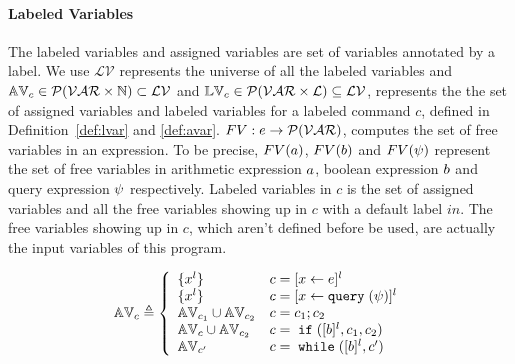 \paragraph{Labeled Variables}
The labeled variables and assigned variables are set of variables annotated by a label. 
We use  
$\mathcal{LV}$ represents the universe of all the labeled variables and 
$\mathbb{AV}_c \in \mathcal{P}(\mathcal{VAR} \times \mathbb{N}) \subset \mathcal{LV}$ and 
$\mathbb{LV}_c \in \mathcal{P}(\mathcal{VAR} \times \mathcal{L}) \subseteq \mathcal{LV}$,
represents the the set of assigned variables and labeled variables for a labeled command $c$,
defined in Definition~\ref{def:lvar} and \ref{def:avar}.
%
$FV: e \to \mathcal{P}(\mathcal{VAR})$, computes the set of free variables in an expression. To be precise,
$FV(a)$, $FV(b)$ and $FV(\psi)$ represent the set of free variables in arithmetic
expression $a$, boolean expression $b$ and query expression $\psi$ respectively.
Labeled variables in $c$ is the set of assigned variables and all the free variables
showing up in $c$ with a default label $in$. 
The free variables
showing up in $c$, which aren't defined before be used, are actually the input variables of this program.
%
%
\begin{defn}
\label{def:avar}
$$ \avar_{c} \triangleq
  \left\{
  \begin{array}{ll}
      \{{x}^l\}                   
      & {c} = [{\assign x e}]^{l} 
      \\
      \{{x}^l\}                   
      & {c} = [{\assign x \query(\qexpr)}]^{l} 
      \\
      \avar_{{c_1}} \cup \avar_{{c_2}}  
      & {c} = {c_1};{c_2}
      \\
      \avar_{{c}} \cup \avar_{{c_2}} 
      & {c} =\eif([\bexpr]^{l}, c_1, c_2) 
      \\
      \avar_{{c}'}
      & {c}   = \ewhile ([\bexpr]^{l}, {c}')
\end{array}
\right.
$$
\end{defn}
%
%
